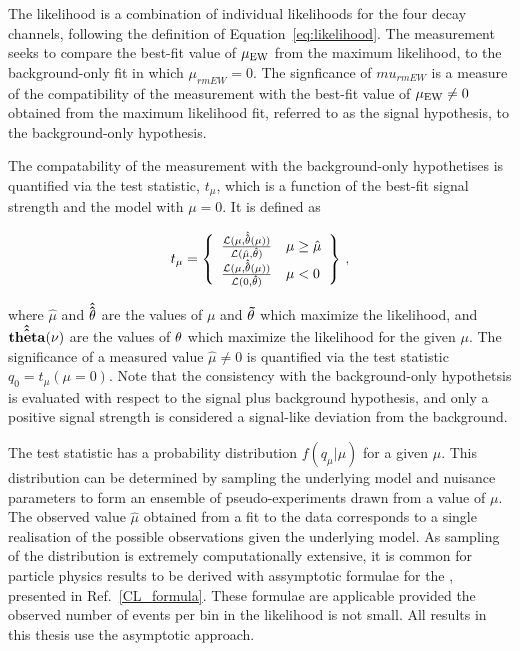 The likelihood is a combination of individual likelihoods for the four decay channels, 
following the definition of Equation~\ref{eq:likelihood}.
The measurement seeks to compare the best-fit value of $\mu_{\rm EW}$ from the 
maximum likelihood, to the background-only fit in which $\mu_{rm EW} = 0$.
The signficance of $mu_{rm EW}$ is a measure of the compatibility of the measurement
with the best-fit value of $\mu_{\rm EW} \ne 0$ obtained from the maximum likelihood
fit, referred to as the signal hypothesis, to
the background-only hypothesis. 

The compatability of the measurement with the background-only hypothetises
is quantified via the test statistic, $t_{\mu}$, which is a function
of the best-fit signal strength and the model with $\mu = 0$. It is defined as

\begin{equation}
  t_{\mu} = \left\{ 
\begin{array}{c l}
  \frac{\mathcal{L}(\mu,{\bf \hat{\hat{\theta}}}(\mu))}
    {\mathcal{L}(\hat{\mu},{\bf \hat{\theta}})}           & \mu \ge \hat{\mu} \\
  \frac{\mathcal{L}(\mu,{\bf \hat{\hat{\theta}}}(\mu))}
    {\mathcal{L}(0,{\bf \hat{\theta}})}           & \mu < 0 \\

\end{array}\right\} \,,
\end{equation}

where $\hat{\mu}$ and ${\bf \hat{\hat{\theta}}}$ are the values of 
$\mu$ and ${\bf \vec{\theta}}$ which maximize the likelihood, and
${\bf \hat{\hat{theta}}}(\nu)$ are the values of ${\bf \theta}$ which 
maximize the likelihood for the given $\mu$.
The significance of a measured value $\hat{\mu} \ne 0$ is quantified
via the test statistic $q_{0} = t_{\mu}(\mu = 0)$.
Note that the consistency with the background-only hypothetsis is evaluated
with respect to the signal plus background hypothesis, and only a positive
signal strength is considered a signal-like deviation from the background.

The test statistic has a probability distribution $f(q_{\mu} | \mu)$
for a given $\mu$. This distribution can be determined by sampling the underlying
model and nuisance parameters to form an ensemble of pseudo-experiments drawn
from a value of $\mu$. The observed value $\hat{\mu}$ obtained from a fit 
to the data corresponds to a single realisation of the possible observations
given the underlying model. 
As sampling of the distribution is extremely computationally extensive,
it is common for particle physics results to be derived with assymptotic
formulae for the , presented in Ref.~\ref{CL_formula}.
These formulae are applicable provided the observed number of events 
per bin in the likelihood is not small. All results in this thesis 
use the asymptotic approach.

